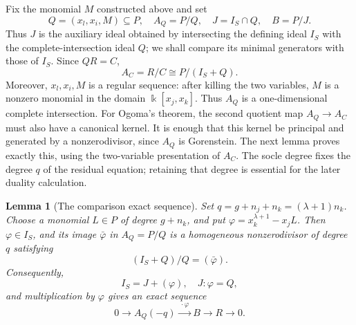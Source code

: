 \documentclass[10pt]{amsart}
\theoremstyle{plain}
\newtheorem{lemma}{Lemma}[section]
\begin{document}
Fix the monomial \(M\) constructed above and set
\[
Q=(x_l,x_i,M)\subseteq P,\quad
A_Q=P/Q,\quad
J=I_S\cap Q,\quad
B=P/J.
\]
Thus \(J\) is the auxiliary ideal obtained by intersecting the defining
ideal \(I_S\) with the complete-intersection ideal \(Q\); we shall
compare its minimal generators with those of \(I_S\).  Since \(QR=C\),
\[
A_C=R/C\cong P/(I_S+Q).
\]
Moreover, \(x_l,x_i,M\) is a regular sequence: after killing the two
variables, \(M\) is a nonzero monomial in the domain
\(\Bbbk[x_j,x_k]\).  Thus \(A_Q\) is a one-dimensional complete
intersection.  For Ogoma's theorem, the second quotient map
\(A_Q\to A_C\) must also have a canonical kernel.  It is enough that
this kernel be principal and generated by a nonzerodivisor, since
\(A_Q\) is Gorenstein.  The next lemma proves exactly this, using the
two-variable presentation of \(A_C\).  The socle degree fixes the
degree \(q\) of the residual equation; retaining that degree is
essential for the later duality calculation.

\begin{lemma}[The comparison exact sequence]\label{lem:type3-equation}
Set \(q=g+n_j+n_k=(\lambda+1)n_k\).  Choose a monomial \(L\in P\)
of degree \(g+n_k\), and put
\(\varphi=x_k^{\lambda+1}-x_jL\).  Then \(\varphi\in I_S\), and its
image \(\bar\varphi\) in \(A_Q=P/Q\) is a homogeneous
nonzerodivisor of degree \(q\) satisfying
\[
(I_S+Q)/Q=(\bar\varphi).
\]
Consequently,
\[
I_S=J+(\varphi),
\quad
J:\varphi=Q,
\]
and multiplication by \(\varphi\) gives an exact sequence
\begin{equation}\label{eq:type3-exact-sequence}
0\longrightarrow A_Q(-q)\xrightarrow{\ \cdot\varphi\ }B
\longrightarrow R\longrightarrow0.
\end{equation}
\end{lemma}
\end{document}
